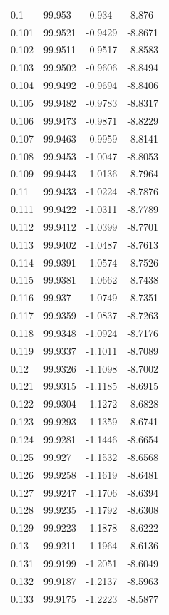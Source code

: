 \begin{tabular}{llll}
0.1 & 99.953 & -0.934 & -8.876 \\
0.101 & 99.9521 & -0.9429 & -8.8671 \\
0.102 & 99.9511 & -0.9517 & -8.8583 \\
0.103 & 99.9502 & -0.9606 & -8.8494 \\
0.104 & 99.9492 & -0.9694 & -8.8406 \\
0.105 & 99.9482 & -0.9783 & -8.8317 \\
0.106 & 99.9473 & -0.9871 & -8.8229 \\
0.107 & 99.9463 & -0.9959 & -8.8141 \\
0.108 & 99.9453 & -1.0047 & -8.8053 \\
0.109 & 99.9443 & -1.0136 & -8.7964 \\
0.11 & 99.9433 & -1.0224 & -8.7876 \\
0.111 & 99.9422 & -1.0311 & -8.7789 \\
0.112 & 99.9412 & -1.0399 & -8.7701 \\
0.113 & 99.9402 & -1.0487 & -8.7613 \\
0.114 & 99.9391 & -1.0574 & -8.7526 \\
0.115 & 99.9381 & -1.0662 & -8.7438 \\
0.116 & 99.937 & -1.0749 & -8.7351 \\
0.117 & 99.9359 & -1.0837 & -8.7263 \\
0.118 & 99.9348 & -1.0924 & -8.7176 \\
0.119 & 99.9337 & -1.1011 & -8.7089 \\
0.12 & 99.9326 & -1.1098 & -8.7002 \\
0.121 & 99.9315 & -1.1185 & -8.6915 \\
0.122 & 99.9304 & -1.1272 & -8.6828 \\
0.123 & 99.9293 & -1.1359 & -8.6741 \\
0.124 & 99.9281 & -1.1446 & -8.6654 \\
0.125 & 99.927 & -1.1532 & -8.6568 \\
0.126 & 99.9258 & -1.1619 & -8.6481 \\
0.127 & 99.9247 & -1.1706 & -8.6394 \\
0.128 & 99.9235 & -1.1792 & -8.6308 \\
0.129 & 99.9223 & -1.1878 & -8.6222 \\
0.13 & 99.9211 & -1.1964 & -8.6136 \\
0.131 & 99.9199 & -1.2051 & -8.6049 \\
0.132 & 99.9187 & -1.2137 & -8.5963 \\
0.133 & 99.9175 & -1.2223 & -8.5877 \\

\end{tabular}
